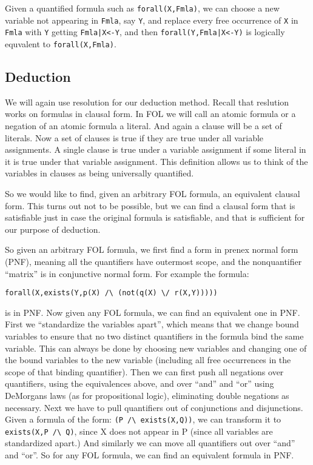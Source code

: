 Given a quantified formula such as \verb|forall(X,Fmla)|, we can choose a new
variable not appearing in \verb|Fmla|, say \verb|Y|, and replace every free
occurrence of \verb|X| in \verb|Fmla| with \verb|Y| getting \verb/Fmla|X<-Y/, and then
\verb/forall(Y,Fmla|X<-Y)/ is logically equvalent to \verb|forall(X,Fmla)|.

\subsection{Deduction}

We will again use resolution for our deduction method.  Recall that
reslution works on formulas in clausal form.  In FOL we will call an
atomic formula or a negation of an atomic formula a literal.  And
again a clause will be a set of literals.  Now a set of clauses is
true if they are true under all variable assignments.  A single clause is
true under a variable assignment if some literal in it is true under
that variable assignment.  This definition allows us to think of
the variables in clauses as being universally quantified.

So we would like to find, given an arbitrary FOL formula, an
equivalent clausal form.  This turns out not to be possible, but we
can find a clausal form that is satisfiable just in case the original
formula is satisfiable, and that is sufficient for our purpose of
deduction.

So given an arbitrary FOL formula, we first find a form in prenex
normal form (PNF), meaning all the quantifiers have outermost scope, and
the nonquantifier ``matrix'' is in conjunctive normal form.  For
example the formula:
\begin{verbatim}
forall(X,exists(Y,p(X) /\ (not(q(X) \/ r(X,Y)))))
\end{verbatim}
is in PNF.  Now given any FOL formula, we can find an equivalent one
in PNF.  First we ``standardize the variables apart'', which means
that we change bound variables to ensure that no two distinct
quantifiers in the formula bind the same variable.  This can always be
done by choosing new variables and changing one of the bound variables
to the new variable (including all free occurrences in the scope of
that binding quantifier).  Then we can first push all negations over quantifiers,
using the equivalences above, and over ``and'' and ``or'' using
DeMorgans laws (as for propositional logic), eliminating double
negations as necessary.  Next we have to pull quantifiers out of
conjunctions and disjunctions.  Given a formula of the form: 
\verb|(P /\ exists(X,Q))|, we can transform it to 
\verb|exists(X,P /\ Q)|, since X does
not appear in P (since all variables are standardized apart.)  And
similarly we can move all quantifiers out over ``and'' and ``or''.  So
for any FOL formula, we can find an equivalent formula in PNF.

